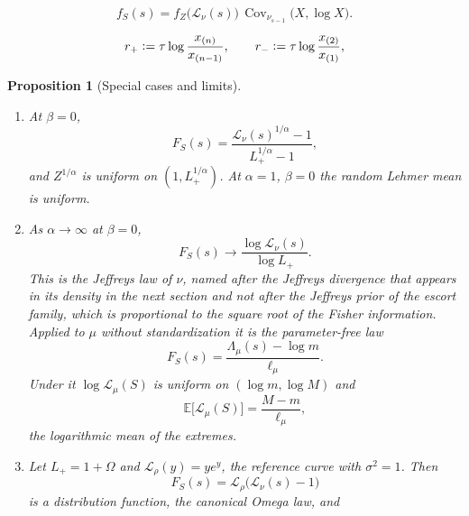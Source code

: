 \documentclass[10pt,a4paper]{amsart}
\newtheorem{proposition}{Proposition}
\providecommand{\Cov}{\operatorname{Cov}}
\providecommand{\E}{\mathbb{E}}
\providecommand{\Leh}{\mathscr{L}}
\providecommand{\eqdef}{\mathrel{\vcentcolon=}}
\begin{document}
			\begin{equation}\label{eq:ll}
				f_S(s)=f_Z\bigl(\Leh_\nu(s)\bigr)\,\Cov_{\nu_{s-1}}\bigl(X,\log X\bigr).
			\end{equation}

	\begin{equation}\label{eq:gaps}
		r_+\eqdef\tau\log\frac{x_{(n)}}{x_{(n-1)}},
		\qquad
		r_-\eqdef\tau\log\frac{x_{(2)}}{x_{(1)}},
	\end{equation}

	\begin{proposition}[Special cases and limits]
		\label{prop:limits}\leavevmode
		\begin{enumerate}[label=\textup{(\roman*)},leftmargin=2.2em]
			\item At $\beta=0$,
			\begin{equation}\label{eq:powermap}
				F_S(s)=\frac{\Leh_\nu(s)^{1/\alpha}-1}{L_+^{1/\alpha}-1},
			\end{equation}
			and $Z^{1/\alpha}$ is uniform on $(1,L_+^{1/\alpha})$. At
			$\alpha=1$, $\beta=0$ the random Lehmer mean is uniform.
			\item As $\alpha\to\infty$ at $\beta=0$,
			\begin{equation}\label{eq:jeffreysF}
				F_S(s)\longrightarrow\frac{\log\Leh_\nu(s)}{\log L_+} .
			\end{equation}
			This is the \emph{Jeffreys law} of $\nu$, named after the
			Jeffreys divergence that appears in its density in the next
			section and not after the Jeffreys prior of the escort family,
			which is proportional to the square root of the Fisher
			information. Applied to $\mu$ without standardization it is the
			parameter-free law
			\begin{equation}\label{eq:jeffreysraw}
				F_S(s)=\frac{\Lambda_\mu(s)-\log m}{\ell_\mu} .
			\end{equation}
			Under it $\log\Leh_\mu(S)$ is uniform on $(\log m,\log M)$ and
			\begin{equation}\label{eq:logmean}
				\E\bigl[\Leh_\mu(S)\bigr]=\frac{M-m}{\ell_\mu},
			\end{equation}
			the logarithmic mean of the extremes.
			\item Let $L_+=1+\Omega$ and $\Leh_\rho(y)=ye^{y}$, the reference curve
			with $\sigma^{2}=1$. Then
			\begin{equation}\label{eq:canonical}
				F_S(s)=\Leh_\rho\bigl(\Leh_\nu(s)-1\bigr)
			\end{equation}
			is a distribution function, the \emph{canonical Omega law}, and

\end{enumerate}
\end{proposition}
\end{document}
